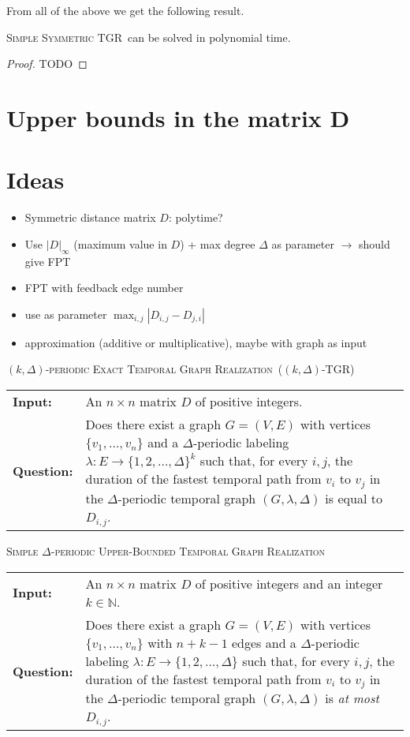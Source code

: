 \documentclass[a4paper,UKenglish,cleveref, autoref, thm-restate]{lipics-v2021}
\makeatletter
\newcommand{\problemdef}[3]{
	\begin{center}
		\begin{minipage}{0.95\textwidth}
			\noindent
			#1
			\vspace{5pt}\\
			\setlength{\tabcolsep}{3pt}
			\begin{tabularx}{\textwidth}{@{}lX@{}}
				\textbf{Input:}& #2 \\
				\textbf{Question:}& #3
			\end{tabularx}
		\end{minipage}
	\end{center}
}
\newcommand{\deltaSymExact}{\textsc{Simple Symmetric TGR}}
\newcommand{\kDeltaExactLong}{\textsc{$(k,\Delta)$-periodic Exact Temporal Graph Realization}}
\newcommand{\kDeltaExact}{\textsc{$(k,\Delta)$-TGR}}
\newcommand{\kDeltaUpperBoundLong}{\textsc{Simple $\Delta$-periodic Upper-Bounded Temporal Graph Realization}}
\makeatother
\begin{document}
From all of the above we get the following result.
\begin{theorem}
	\deltaSymExact\ can be solved in polynomial time.
\end{theorem}

\begin{proof}
	TODO
\end{proof}

\section{Upper bounds in the matrix D}

	
	
\clearpage

\section{Ideas}
\begin{itemize}
    \item Symmetric distance matrix $D$: polytime?
    \item Use $|D|_\infty$ (maximum value in $D$) + max degree $\Delta$ as parameter $\rightarrow$ should give FPT
    \item FPT with feedback edge number
    \item use as parameter $\max_{i,j} |D_{i,j}-D_{j,i}|$
    \item approximation (additive or multiplicative), maybe with graph as input
\end{itemize}

\problemdef{\kDeltaExactLong\ (\kDeltaExact)}
{An $n \times n$ matrix $D$ of positive integers.}
{Does there exist a graph $G=(V,E)$ with vertices $\{v_1,\ldots,v_{n}\}$ 
and a $\Delta$-periodic labeling $\lambda: E \rightarrow \{1,2,\ldots,\Delta\}^k$ such that, 
for every $i,j$, the duration of the fastest temporal path from $v_i$ to $v_j$ in the $\Delta$-periodic temporal graph $(G,\lambda,\Delta)$ is equal to $D_{i,j}$.}

\problemdef{\kDeltaUpperBoundLong}
{An $n \times n$ matrix $D$ of positive integers and an integer $k\in \mathbb{N}$.}
{Does there exist a graph $G=(V,E)$ with vertices $\{v_1,\ldots,v_{n}\}$ with $n+k-1$ edges 
	and a $\Delta$-periodic labeling $\lambda: E \rightarrow \{1,2,\ldots,\Delta\}$ such that, 
	for every $i,j$, the duration of the fastest temporal path from $v_i$ to $v_j$ in the $\Delta$-periodic temporal graph $(G,\lambda,\Delta)$ is \emph{at most} $D_{i,j}$.}
\end{document}
